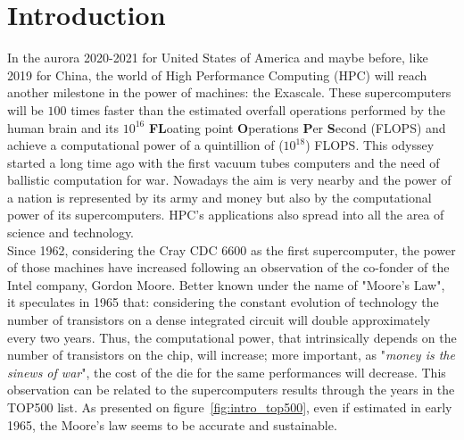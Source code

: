 \chapter*{Introduction}

In the aurora 2020-2021 for United States of America and maybe before, like 2019 for China, the world of High Performance Computing (HPC) will reach another milestone in the power of machines: the Exascale. 
These supercomputers will be $100$ times faster than the estimated overfall operations performed by the human brain and its $10^{16}$ \textbf{FL}oating point \textbf{O}perations \textbf{P}er \textbf{S}econd (FLOPS) and achieve a computational power of a quintillion of ($10^{18}$) FLOPS.
This odyssey started a long time ago with the first vacuum tubes computers and the need of ballistic computation for war. 
Nowadays the aim is very nearby and the power of a nation is represented by its army and money but also by the computational power of its supercomputers.
HPC's applications also spread into all the area of science and technology.\\

Since 1962, considering the Cray CDC 6600 as the first supercomputer, the power of those machines have increased following an observation of the co-fonder of the Intel company, Gordon Moore. 
Better known under the name of "Moore's Law", it speculates in 1965 that: considering the constant evolution of technology the number of transistors on a dense integrated circuit will double approximately every two years. 
Thus, the computational power, that intrinsically depends on the number of transistors on the chip, will increase; more important, as "\textit{money is the sinews of war}", the cost of the die for the same performances will decrease.  
This observation can be related to the supercomputers results through the years in the TOP500 list. 
As presented on figure~\ref{fig:intro_top500}, even if estimated in early 1965, the Moore's law seems to be accurate and sustainable. 

